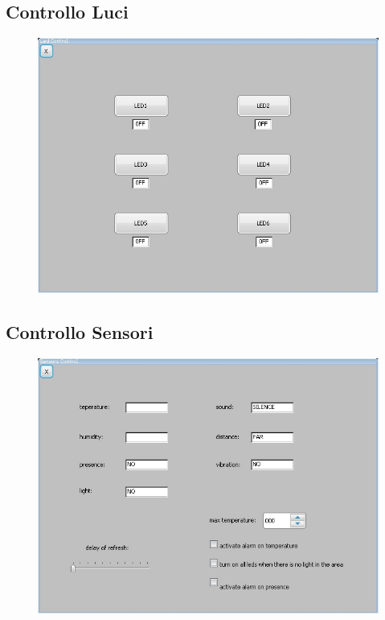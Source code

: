 \documentclass[a4paper,titlepage]{book}
\begin{document}
\newpage
\subsection{Controllo Luci}

\begin{figure}[!h]
\centering
\includegraphics[scale=0.6]{ledgui.jpg}
\end{figure}

\newpage
\subsection{Controllo Sensori}

\begin{figure}[!h]
\centering
\includegraphics[scale=0.6]{sensorgui.jpg}
\end{figure}
\end{document}
